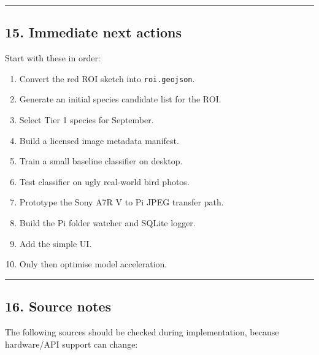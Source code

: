 \documentclass[
  11pt,
]{article}
\providecommand{\tightlist}{%
  \setlength{\itemsep}{0pt}\setlength{\parskip}{0pt}}
\begin{document}
\begin{center}\rule{0.5\linewidth}{0.5pt}\end{center}

\subsection{15. Immediate next actions}\label{immediate-next-actions}

Start with these in order:

\begin{enumerate}
\def\labelenumi{\arabic{enumi}.}
\tightlist
\item
  Convert the red ROI sketch into \texttt{roi.geojson}.
\item
  Generate an initial species candidate list for the ROI.
\item
  Select Tier 1 species for September.
\item
  Build a licensed image metadata manifest.
\item
  Train a small baseline classifier on desktop.
\item
  Test classifier on ugly real-world bird photos.
\item
  Prototype the Sony A7R V to Pi JPEG transfer path.
\item
  Build the Pi folder watcher and SQLite logger.
\item
  Add the simple UI.
\item
  Only then optimise model acceleration.
\end{enumerate}

\begin{center}\rule{0.5\linewidth}{0.5pt}\end{center}

\subsection{16. Source notes}\label{source-notes}

The following sources should be checked during implementation, because
hardware/API support can change:
\end{document}
